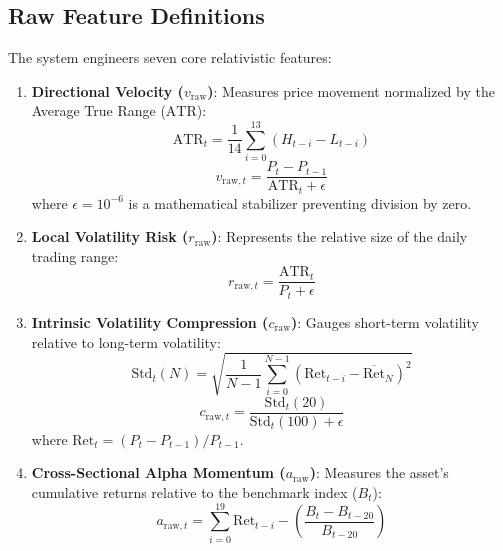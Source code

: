 \documentclass[11pt,a4paper]{article}
\begin{document}
\subsection{Raw Feature Definitions}

The system engineers seven core relativistic features:
\begin{enumerate}
    \item \textbf{Directional Velocity ($v_{\text{raw}}$)}: Measures price movement normalized by the Average True Range ($\text{ATR}$):
    \begin{equation}
        \text{ATR}_t = \frac{1}{14} \sum_{i=0}^{13} (H_{t-i} - L_{t-i})
    \end{equation}
    \begin{equation}
        v_{\text{raw}, t} = \frac{P_t - P_{t-1}}{\text{ATR}_t + \epsilon}
    \end{equation}
    where $\epsilon = 10^{-6}$ is a mathematical stabilizer preventing division by zero.
    
    \item \textbf{Local Volatility Risk ($r_{\text{raw}}$)}: Represents the relative size of the daily trading range:
    \begin{equation}
        r_{\text{raw}, t} = \frac{\text{ATR}_t}{P_t + \epsilon}
    \end{equation}
    
    \item \textbf{Intrinsic Volatility Compression ($c_{\text{raw}}$)}: Gauges short-term volatility relative to long-term volatility:
    \begin{equation}
        \text{Std}_t(N) = \sqrt{\frac{1}{N-1} \sum_{i=0}^{N-1} (\text{Ret}_{t-i} - \overline{\text{Ret}}_N)^2}
    \end{equation}
    \begin{equation}
        c_{\text{raw}, t} = \frac{\text{Std}_t(20)}{\text{Std}_t(100) + \epsilon}
    \end{equation}
    where $\text{Ret}_t = (P_t - P_{t-1})/P_{t-1}$.
    
    \item \textbf{Cross-Sectional Alpha Momentum ($a_{\text{raw}}$)}: Measures the asset's cumulative returns relative to the benchmark index ($B_t$):
    \begin{equation}
        a_{\text{raw}, t} = \sum_{i=0}^{19} \text{Ret}_{t-i} - \left( \frac{B_t - B_{t-20}}{B_{t-20}} \right)
    \end{equation}
    

\end{enumerate}
\end{document}
